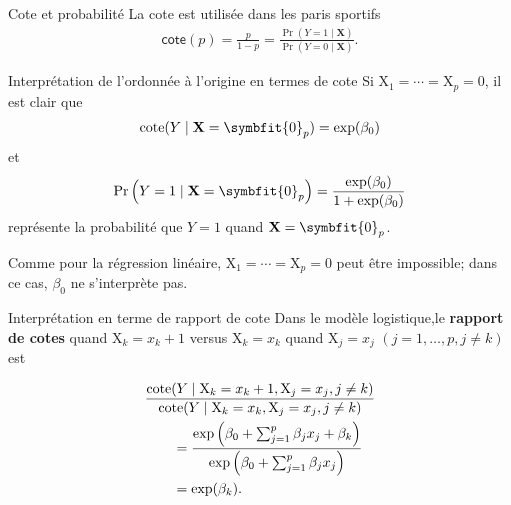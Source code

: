 \documentclass[
  ignorenonframetext,
]{beamer}
\renewcommand{\boldsymbol}[1]{\symbfit{#1}}
\begin{document}
\begin{frame}{Cote et probabilité}
\protect{}\label{cote-et-probabilituxe9}
La cote est utilisée dans les paris sportifs \begin{align*}
 \mathsf{cote}(p) = \frac{p}{1-p} = \frac{\Pr(Y=1 \mid \mathbf{X})}{\Pr(Y=0 \mid \mathbf{X})}.
\end{align*}

\begin{table}

\caption{\label{tbl-cotes}Cote et probabilité de succès}


\end{table}%
\end{frame}

\begin{frame}{Interprétation de l'ordonnée à l'origine en termes de
cote}
\protect{}\label{interpruxe9tation-de-lordonnuxe9e-uxe0-lorigine-en-termes-de-cote}
Si \(\mathrm{X}_1=\cdots = \mathrm{X}_p=0\), il est clair que
\begin{align*}
\mathrm{cote}(Y\mid \mathbf{X}=\boldsymbol{0}_p) = \exp(\beta_0)
\end{align*} et \begin{align*}
\Pr\left(Y=1\mid  \mathbf{X}=\boldsymbol{0}_p\right) = \frac{\exp({\beta_0})}{1+\exp({\beta_0})}
\end{align*} représente la probabilité que \(Y=1\) quand
\(\mathbf{X}=\boldsymbol{0}_p\).

Comme pour la régression linéaire,
\(\mathrm{X}_1=\cdots =\mathrm{X}_p=0\) peut être impossible; dans ce
cas, \(\beta_0\) ne s'interprète pas.
\end{frame}

\begin{frame}{Interprétation en terme de rapport de cote}
\protect{}\label{interpruxe9tation-en-terme-de-rapport-de-cote}
Dans le modèle logistique,le \textbf{rapport de cotes} quand
\(\mathrm{X}_k=x_k+1\) versus \(\mathrm{X}_k=x_k\) quand
\(\mathrm{X}_j=x_j\) \((j=1, \ldots, p, j \neq k)\) est

\begin{align*}
\MoveEqLeft\frac{\mathrm{cote}(Y \mid  \mathrm{X}_k=x_k+1, \mathrm{X}_j=x_j, j\neq k)}{\mathrm{cote}(Y \mid \mathrm{X}_k=x_k, \mathrm{X}_j=x_j, j \neq k)}\\&=\frac{\exp\left(\beta_0+ \sum_{j=1}^p\beta_j x_j + \beta_k \right)}{\exp\left(\beta_0+ \sum_{j=1}^p\beta_j x_j \right)}\\
&= \exp(\beta_k).
\end{align*}
\end{frame}
\end{document}
